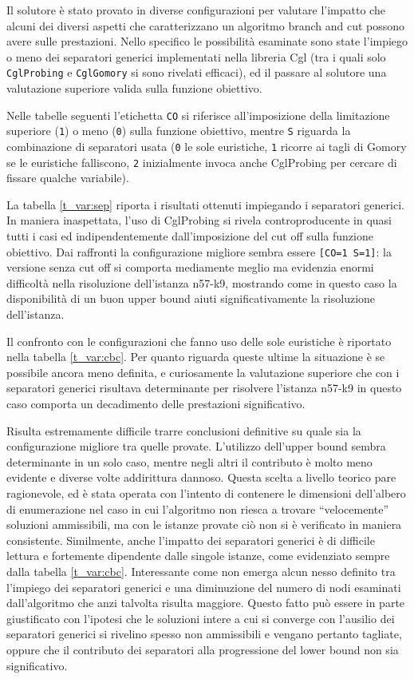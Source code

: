 \documentclass[11pt,oneside,a4paper]{article}
\begin{document}
Il solutore è stato provato in diverse configurazioni per valutare l'impatto che alcuni dei diversi
aspetti che caratterizzano un algoritmo branch and cut possono avere sulle prestazioni.
Nello specifico le possibilità esaminate sono state l'impiego o meno dei separatori generici implementati
nella libreria Cgl (tra i quali solo \texttt{CglProbing} e \texttt{CglGomory} si sono rivelati efficaci),
ed il passare al solutore una valutazione superiore valida sulla funzione obiettivo.

Nelle tabelle seguenti l'etichetta \texttt{CO} si riferisce all'imposizione della limitazione superiore (\texttt{1})
o meno (\texttt{0}) sulla funzione obiettivo, mentre \texttt{S} riguarda la combinazione
di separatori usata (\texttt{0} le sole euristiche, \texttt{1} ricorre ai tagli di Gomory se le
euristiche falliscono, \texttt{2} inizialmente invoca anche CglProbing per cercare di fissare qualche
variabile).

La tabella \ref{t_var:sep} riporta i risultati ottenuti impiegando i separatori generici. In maniera
inaspettata, l'uso di CglProbing si rivela controproducente in quasi
tutti i casi ed indipendentemente dall'imposizione del cut off sulla funzione obiettivo. Dai raffronti
la configurazione migliore sembra essere \texttt{[CO=1 S=1]}: la versione senza cut off si comporta
mediamente meglio ma evidenzia enormi difficoltà nella risoluzione dell'istanza n57-k9, mostrando come in
questo caso la disponibilità di un buon upper bound aiuti significativamente la risoluzione dell'istanza.

Il confronto con le configurazioni che fanno uso delle sole euristiche è riportato nella tabella
\ref{t_var:cbc}. Per quanto riguarda queste ultime la situazione è se possibile ancora meno definita, e
curiosamente la valutazione superiore che con i separatori generici risultava determinante per risolvere
l'istanza n57-k9 in questo caso comporta un decadimento delle prestazioni significativo.

Risulta estremamente difficile trarre conclusioni definitive su quale sia la configurazione
migliore tra quelle provate. L'utilizzo dell'upper bound sembra determinante in un solo caso,
mentre negli altri il contributo è molto meno evidente e diverse volte addirittura dannoso.
Questa scelta a livello teorico pare ragionevole, ed è stata operata con l'intento di contenere le
dimensioni dell'albero di enumerazione nel caso in cui l'algoritmo non riesca a trovare ``velocemente''
soluzioni ammissibili, ma con le istanze provate ciò non si è verificato in maniera consistente.
Similmente, anche l'impatto dei separatori generici è di difficile lettura e fortemente dipendente
dalle singole istanze, come evidenziato sempre dalla tabella \ref{t_var:cbc}. Interessante come
non emerga alcun nesso definito tra l'impiego dei separatori generici e una diminuzione del
numero di nodi esaminati dall'algoritmo che anzi talvolta risulta maggiore. Questo fatto può
essere in parte giustificato con l'ipotesi che le soluzioni intere a cui si converge con l'ausilio dei
separatori generici si rivelino spesso non ammissibili e vengano pertanto tagliate, oppure che il contributo
dei separatori alla progressione del lower bound non sia significativo.
\end{document}
